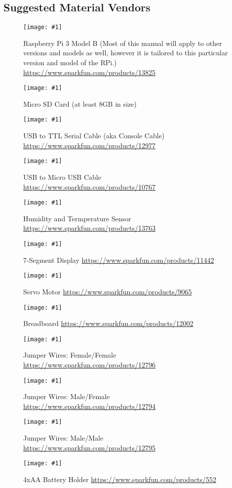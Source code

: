 \documentclass{article}
\newcommand{\imagefigs}[2]{
    \begin{figure}[H]
        \centering
        \texttt{[image: \#1]}
        \caption{#2}
    \end{figure}
}
\begin{document}
\begin{appendices}
  \subsection{Suggested Material Vendors}
    \imagefigs{resources/material-images/vendor-rpi}{Raspberry Pi 3 Model B (Most of this manual will apply to other versions and models as well, however it is tailored to this particular version and model of the RPi.) \href{https://www.sparkfun.com/products/13825}{https://www.sparkfun.com/products/13825} \label{sec:vendor-rpi}}
    \imagefigs{resources/material-images/vendor-micro-sd}{Micro SD Card (at least 8GB in size) \href{https://www.adafruit.com/product/1583}
          \label{sec:vendor-sd}}
    \imagefigs{resources/material-images/vendor-ttl-serial-cable}{USB to TTL Serial Cable (aka Console Cable) \href{https://www.sparkfun.com/products/12977}{https://www.sparkfun.com/products/12977}
          \label{sec:vendor-usbttlserial}}
    \imagefigs{resources/material-images/vendor-usb-micro-cable}{USB to Micro USB Cable \href{https://www.sparkfun.com/products/10767}{https://www.sparkfun.com/products/10767}
          \label{sec:vendor-usbmusb}}
    \imagefigs{resources/material-images/vendor-si7021}{Humidity and Termperature Sensor \href{https://www.sparkfun.com/products/13763}{https://www.sparkfun.com/products/13763}
          \label{sec:vendor-sensor}}
    \imagefigs{resources/material-images/vendor-seg7}{7-Segment Display \href{https://www.sparkfun.com/products/11442}{https://www.sparkfun.com/products/11442}
          \label{sec:vendor-7seg}}
    \imagefigs{resources/material-images/vendor-servo}{Servo Motor \href{https://www.sparkfun.com/products/9065}{https://www.sparkfun.com/products/9065}
          \label{sec:vendor-servo}}
    \imagefigs{resources/material-images/vendor-breadboard}{Breadboard \href{https://www.sparkfun.com/products/12002}{https://www.sparkfun.com/products/12002}
          \label{sec:vendor-breadboard}}
    \imagefigs{resources/material-images/vendor-f-f-jumper}{Jumper Wires: Female/Female \href{https://www.sparkfun.com/products/12796}{https://www.sparkfun.com/products/12796}}
    \imagefigs{resources/material-images/vendor-f-m-jumper}{Jumper Wires: Male/Female \href{https://www.sparkfun.com/products/12794}{https://www.sparkfun.com/products/12794}}
    \imagefigs{resources/material-images/vendor-m-m-jumper}{Jumper Wires: Male/Male \href{https://www.sparkfun.com/products/12795}{https://www.sparkfun.com/products/12795}}
    \label{sec:vendor-wires}
    \imagefigs{resources/material-images/vendor-battery-holder}{4xAA Battery Holder \href{https://www.sparkfun.com/products/552}{https://www.sparkfun.com/products/552}
          \label{sec:vendor-batholder}}
\end{appendices}
%   
\end{document}
